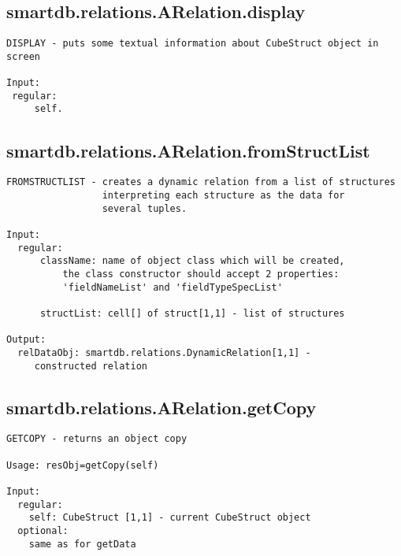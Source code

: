 \subsection{\texorpdfstring{smartdb.relations.ARelation.display}{display}}\label{method:smartdb.relations.ARelation.display}
\begin{verbatim}
DISPLAY - puts some textual information about CubeStruct object in screen

Input:
 regular:
     self.
\end{verbatim}
\subsection{\texorpdfstring{smartdb.relations.ARelation.fromStructList}{fromStructList}}\label{method:smartdb.relations.ARelation.fromStructList}
\begin{verbatim}
FROMSTRUCTLIST - creates a dynamic relation from a list of structures
                 interpreting each structure as the data for
                 several tuples.

Input:
  regular:
      className: name of object class which will be created,
          the class constructor should accept 2 properties:
          'fieldNameList' and 'fieldTypeSpecList'

      structList: cell[] of struct[1,1] - list of structures

Output:
  relDataObj: smartdb.relations.DynamicRelation[1,1] -
     constructed relation
\end{verbatim}
\subsection{\texorpdfstring{smartdb.relations.ARelation.getCopy}{getCopy}}\label{method:smartdb.relations.ARelation.getCopy}
\begin{verbatim}
GETCOPY - returns an object copy

Usage: resObj=getCopy(self)

Input:
  regular:
    self: CubeStruct [1,1] - current CubeStruct object
  optional:
    same as for getData
\end{verbatim}

